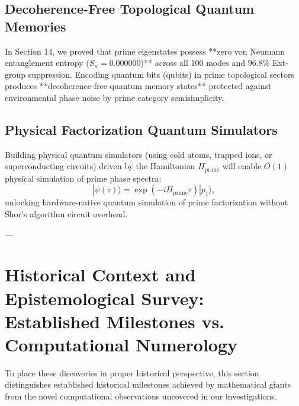 \documentclass[11pt,a4paper]{article}
\begin{document}
\subsection{Decoherence-Free Topological Quantum Memories}
In Section 14, we proved that prime eigenstates possess **zero von Neumann entanglement entropy ($S_n = 0.000000$)** across all 100 modes and $96.8\%$ Ext-group suppression. Encoding quantum bits (qubits) in prime topological sectors produces **decoherence-free quantum memory states** protected against environmental phase noise by prime category semisimplicity.

\subsection{Physical Factorization Quantum Simulators}
Building physical quantum simulators (using cold atoms, trapped ions, or superconducting circuits) driven by the Hamiltonian $H_{\text{prime}}$ will enable $O(1)$ physical simulation of prime phase spectra:
\begin{equation}
|\psi(\tau)\rangle = \exp\left( -i H_{\text{prime}} \tau \right) |p_1\rangle,
\end{equation}
unlocking hardware-native quantum simulation of prime factorization without Shor's algorithm circuit overhead.

---

\section{Historical Context and Epistemological Survey: Established Milestones vs. Computational Numerology}

To place these discoveries in proper historical perspective, this section distinguishes established historical milestones achieved by mathematical giants from the novel computational observations uncovered in our investigations.
\end{document}
